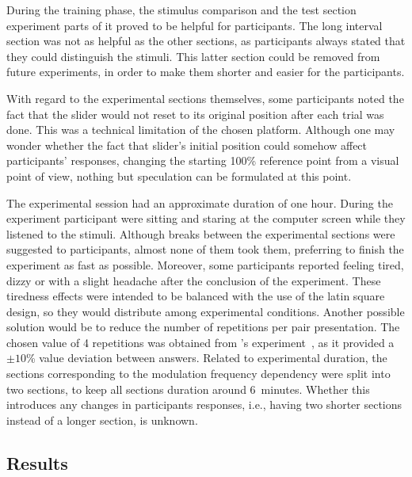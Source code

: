 \documentclass[../main.tex]{subfiles}
\begin{document}
During the training phase, the stimulus comparison and the test section
experiment parts of it proved to be helpful for participants. The long interval
section was not as helpful as the other sections, as participants always stated
that they could distinguish the stimuli. This latter section could be removed
from future experiments, in order to make them shorter and easier for the
participants.

With regard to the experimental sections themselves, some participants noted
the fact that the slider would not reset to its original position after each
trial was done. This was a technical limitation of the chosen platform. Although
one may wonder whether the fact that slider's initial position could somehow
affect participants' responses, changing the starting 100\% reference point from
a visual point of view, nothing but speculation can be formulated at this point.

The experimental session had an approximate duration of one hour. During the
experiment participant were sitting and staring at the computer screen while
they listened to the stimuli. Although breaks between the experimental sections
were suggested to participants, almost none of them took them, preferring to
finish the experiment as fast as possible. Moreover, some participants reported
feeling tired, dizzy or with a slight headache after the conclusion of the
experiment. These tiredness effects were intended to be balanced with the use of
the latin square design, so they would distribute among experimental conditions.
Another possible solution would be to reduce the number of repetitions per pair
presentation. The chosen value of 4 repetitions was obtained from
\citeauthor{Fastl1982Fluctuation}'s experiment~\cite{Fastl1982Fluctuation}, as
it provided a $\pm10$\% value deviation between answers. Related to experimental
duration, the sections corresponding to the modulation frequency dependency were
split into two sections, to keep all sections duration around 6~minutes. Whether
this introduces any changes in participants responses, i.e., having two shorter
sections instead of a longer section, is unknown.

\subsection{Results}
\end{document}
